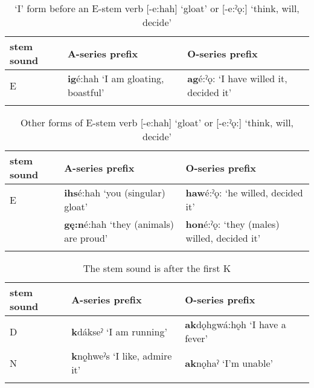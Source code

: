 \begin{table}
\caption{‘I’ form before an E-stem verb [-e:hah] ‘gloat’ or [-e:ˀǫ:] ‘think, will, decide’}
\label{tab:1:fstestem}
\scriptsize{
\begin{tabularx}{\textwidth}{XXX}
\lsptoprule
stem sound & A-series prefix & O-series prefix\\
\midrule
 E & \textbf{ig}é:hah ‘I am gloating, boastful’ & \textbf{ag}é:ˀǫ: ‘I have willed it, decided it’\\
\lspbottomrule
\end{tabularx}}
\end{table}


\begin{table}
\caption{Other forms of E-stem verb [-e:hah] ‘gloat’ or [-e:ˀǫ:] ‘think, will, decide’}
\label{tab:1:otherest}
\scriptsize{
\begin{tabularx}{\textwidth}{XXX}
\lsptoprule
stem sound & A-series prefix & O-series prefix\\
\midrule
 E & \textbf{ihs}é:hah ‘you (singular) gloat’ & \textbf{haw}é:ˀǫ: ‘he willed, decided it’\\
& \textbf{gę:n}é:hah ‘they (animals) are proud’ & \textbf{hon}é:ˀǫ: ‘they (males) willed, decided it’\\
\lspbottomrule
\end{tabularx}}
\end{table}




\begin{table}
\caption{The stem sound is after the first K}
\label{tab:1:kfirst}
\scriptsize{
\begin{tabularx}{\textwidth}{XXX}
\lsptoprule
stem sound & A-series prefix & O-series prefix\\
\midrule
 D & \textbf{k}dákseˀ ‘I am running’ & \textbf{ak}dǫhgwá:hǫh ‘I have a fever’\\
 N & \textbf{k}nǫ̱hweˀs ‘I like, admire it’ & \textbf{ak}nǫhaˀ ‘I’m unable’\\
\lspbottomrule
\end{tabularx}}
\end{table}


